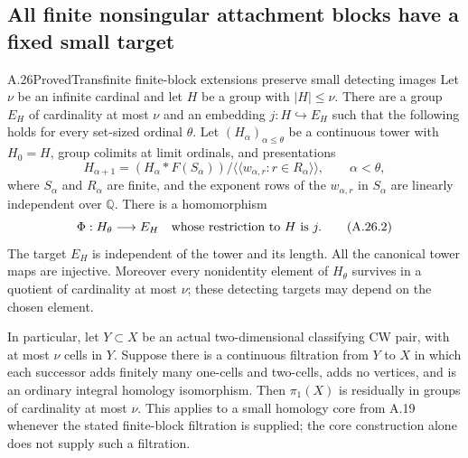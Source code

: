 \subsection{All finite nonsingular attachment blocks have a fixed small target}

\begin{claim}{A.26}{Proved}{Transfinite finite-block extensions preserve small detecting images}
Let $\nu$ be an infinite cardinal and let $H$ be a group with
$|H|\leq\nu$. There are a group $E_H$ of cardinality at most
$\nu$ and an embedding $j:H\hookrightarrow E_H$ such that the
following holds for every set-sized ordinal $\theta$.
Let $(H_\alpha)_{\alpha\leq\theta}$ be a continuous tower with
$H_0=H$, group colimits at limit ordinals, and presentations
\[
 H_{\alpha+1}=
 (H_\alpha*F(S_\alpha))/
 \langle\!\langle w_{\alpha,r}:r\in R_\alpha\rangle\!\rangle,
 \qquad \alpha<\theta,
 \tag{A.26.1}
\]
where $S_\alpha$ and $R_\alpha$ are finite, and the exponent
rows of the $w_{\alpha,r}$ in $S_\alpha$ are linearly
independent over $\mathbb Q$. There is a homomorphism
\[
 \Phi:H_\theta\longrightarrow E_H
 \quad\hbox{whose restriction to }H\hbox{ is }j.
 \tag{A.26.2}
\]
The target $E_H$ is independent of the tower and its length.
All the canonical tower maps are injective. Moreover every
nonidentity element of $H_\theta$ survives in a quotient of
cardinality at most $\nu$; these detecting targets may depend
on the chosen element.

In particular, let $Y\subset X$ be an actual two-dimensional
classifying CW pair, with at most $\nu$ cells in $Y$. Suppose
there is a continuous filtration from $Y$ to $X$ in which
each successor adds finitely many one-cells and two-cells,
adds no vertices, and is an ordinary integral homology
isomorphism. Then $\pi_1(X)$ is residually in groups of
cardinality at most $\nu$. This applies to a small homology
core from A.19 whenever the stated finite-block filtration
is supplied; the core construction alone does not supply
such a filtration.
\end{claim}
